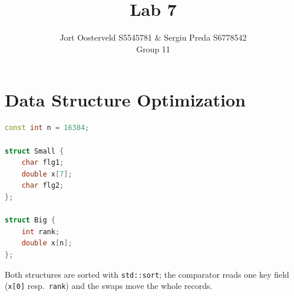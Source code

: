 \documentclass[a4paper,11pt]{article}
\title{\Large{\sc{Performance Engineering}}\\[2mm] Lab 7}
\author{Jort Oosterveld S5545781 \& Sergiu Preda S6778542 \\ Group 11}
\begin{document}
\setlength\parindent{0pt}

\maketitle

\section{Data Structure Optimization}

\begin{lstlisting}[language=C++, caption=Data structures Small and Big]
const int n = 16384;

struct Small {          
    char flg1;          
    double x[7];
    char flg2;
};

struct Big {            
    int rank;           
    double x[n];
};
\end{lstlisting}

Both structures are sorted with \texttt{std::sort}; the comparator reads one key field
(\texttt{x[0]} resp.\ \texttt{rank}) and the swaps move the whole records.

\end{document}
